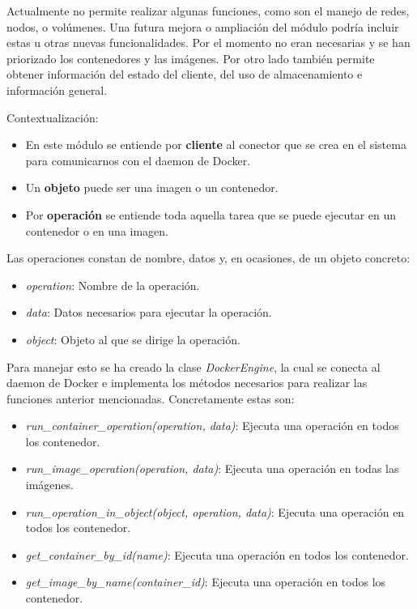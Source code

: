 \bigskip
Actualmente no permite realizar algunas funciones, como son el manejo de redes, nodos, o volúmenes. Una futura mejora o ampliación del módulo podría incluir estas u otras nuevas funcionalidades. Por el momento no eran necesarias y se han priorizado los contenedores y las imágenes. Por otro lado también permite obtener información del estado del cliente, del uso de almacenamiento e información general.

\bigskip
Contextualización:
\begin{itemize}
	\item En este módulo se entiende por \textbf{cliente} al conector que se crea en el sistema para comunicarnos con el daemon de Docker.
	\item Un \textbf{objeto} puede ser una imagen o un contenedor.
	\item Por \textbf{operación} se entiende toda aquella tarea que se puede ejecutar en un contenedor o en una imagen.
\end{itemize}

\bigskip
Las operaciones constan de nombre, datos y, en ocasiones, de un objeto concreto:
\begin{itemize}
	\item \textit{operation}: Nombre de la operación.
	\item \textit{data}: Datos necesarios para ejecutar la operación.
	\item \textit{object}: Objeto al que se dirige la operación.
\end{itemize}


\bigskip
Para manejar esto se ha creado la clase \textit{DockerEngine}, la cual se conecta al daemon de Docker e implementa los métodos necesarios para realizar las funciones anterior mencionadas. Concretamente estas son:
\begin{itemize}
	\item \textit{run\_container\_operation(operation, data)}: Ejecuta una operación en todos los contenedor.
	\item \textit{run\_image\_operation(operation, data)}: Ejecuta una operación en todas las imágenes.
	\item \textit{run\_operation\_in\_object(object, operation, data)}: Ejecuta una operación en todos los contenedor.
	\item \textit{get\_container\_by\_id(name)}: Ejecuta una operación en todos los contenedor.
	\item \textit{get\_image\_by\_name(container\_id)}: Ejecuta una operación en todos los contenedor.
\end{itemize}


